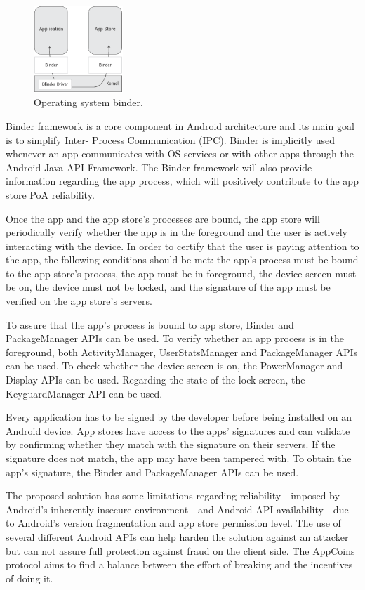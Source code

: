 \begin{figure}[!ht]
\centering
\includegraphics[width=0.3\textwidth]{diagrams/binder_diagram.eps}
\caption{Operating system binder.}
\label{fig:binder}
\end{figure}

Binder framework is a core component in Android architecture and its main goal is to simplify Inter-
Process Communication (IPC). Binder is implicitly used whenever an app communicates with OS 
services or with other apps through the Android Java API Framework. The Binder framework will also 
provide information regarding the app process, which will positively contribute to the app store 
\textsf{PoA} reliability.

Once the app and the app store's processes are bound, the app store will periodically verify whether 
the app is in the foreground and the user is actively interacting with the device. In order to certify that 
the user is paying attention to the app, the following conditions should be met: the app's process must be bound to the app store's process, the app must be in foreground, the device screen must be on, the device must not be locked, and the signature of the app must be verified on the app store's servers.

To assure that the app's process is bound to app store, Binder and PackageManager APIs can be used. 
To verify whether an app process is in the foreground, both ActivityManager, UserStatsManager and  PackageManager APIs can be used. To check whether the device screen is on, the PowerManager 
and Display APIs can be used. Regarding the state of the lock screen, the KeyguardManager API can 
be used. 

Every application has to be signed by the developer before being installed on an Android device. App 
stores have access to the apps' signatures and can validate by confirming whether they match with the 
signature on their servers. If the signature does not match, the app may have been tampered with. To obtain the app's signature, the Binder and PackageManager APIs can be used.

The proposed solution has some limitations regarding reliability - imposed by Android's inherently 
insecure environment - and Android API availability - due to Android's version fragmentation and app 
store permission level. The use of several different Android APIs can help harden the solution 
against an attacker but can not assure full protection against fraud on the client side. The AppCoins protocol aims to find a balance between the effort of breaking and the incentives of doing it.


